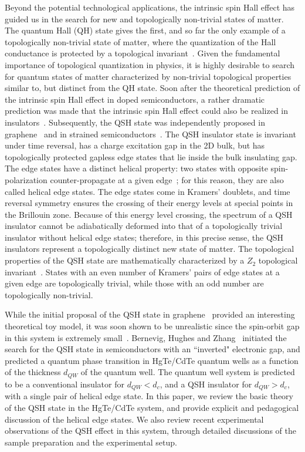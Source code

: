 \documentclass{article}
\begin{document}
Beyond the potential technological applications, the intrinsic spin
Hall effect has guided us in the search for new and topologically
non-trivial states of matter. The quantum Hall (QH) state gives the
first, and so far the only example of a topologically non-trivial
state of matter, where the quantization of the Hall conductance is
protected by a topological invariant~\cite{thouless1982}. Given the
fundamental importance of topological quantization in physics, it is
highly desirable to search for quantum states of matter
characterized by non-trivial topological properties similar to, but
distinct from the QH state. Soon after the theoretical prediction of
the intrinsic spin Hall effect in doped semiconductors, a rather
dramatic prediction was made that the intrinsic spin Hall effect
could also be realized in insulators~\cite{murakami2004a}.
Subsequently, the QSH state was independently proposed in
graphene~\cite{kane2005A} and in strained
semiconductors~\cite{bernevig2006A}. The QSH insulator state is
invariant under time reversal, has a charge excitation gap in the 2D
bulk, but has topologically protected gapless edge states that lie
inside the bulk insulating gap. The edge states have a distinct
helical property: two states with opposite spin-polarization
counter-propagate at a given edge~\cite{kane2005A,wu2006,xu2006};
for this reason, they are also called helical edge states. The edge
states come in Kramers' doublets, and time reversal symmetry ensures
the crossing of their energy levels at special points in the
Brillouin zone. Because of this energy level crossing, the spectrum
of a QSH insulator cannot be adiabatically deformed into that of a
topologically trivial insulator without helical edge states;
therefore, in this precise sense, the QSH insulators represent a
topologically distinct new state of matter. The topological
properties of the QSH state are mathematically characterized by a
$Z_2$ topological invariant~\cite{kane2005B}. States with an even
number of Kramers' pairs of edge states at a given edge are
topologically trivial, while those with an odd number are
topologically non-trivial.

While the initial proposal of the QSH state in
graphene~\cite{kane2005A} provided an interesting theoretical toy
model, it was soon shown to be unrealistic since the spin-orbit
gap in this system is extremely small~\cite{yao2007,min2006}.
Bernevig, Hughes and Zhang~\cite{Bernevig2006d} initiated the
search for the QSH state in semiconductors with an ``inverted"
electronic gap, and predicted a quantum phase transition in
HgTe/CdTe quantum wells as a function of the thickness $d_{QW}$ of
the quantum well. The quantum well system is predicted to be a
conventional insulator for $d_{QW}<d_c$, and a QSH insulator for
$d_{QW}>d_c$, with a single pair of helical edge state. In this
paper, we review the basic theory of the QSH state in the
HgTe/CdTe system, and provide explicit and pedagogical discussion
of the helical edge states. We also review recent experimental
observations of the QSH effect in this system, through detailed
discussions of the sample preparation and the experimental setup.
\end{document}
